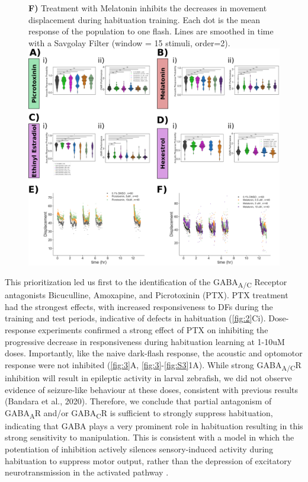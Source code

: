 \documentclass[9pt,lineno]{RandlettLab_elife}
\begin{document}
\begin{figure}
{\textbf{F)} Treatment with Melatonin inhibits the decreases in movement displacement during habituation training. Each dot is the mean response of the population to one flash. Lines are smoothed in time with a Savgolay Filter (window = 15 stimuli, order=2).}{\includegraphics[width=14cm]{FigureS1_DrugBehavData_wDisp}}
\label{fig:S3}
\end{figure}


This prioritization led us first to the identification of the GABA\textsubscript{A/C} Receptor antagonists Bicuculline, Amoxapine, and Picrotoxinin (PTX). PTX treatment had the strongest effects, with increased responsiveness to DFs during the training and test periods, indicative of defects in habituation (\autoref{fig:2}Ci). Dose-response experiments confirmed a strong effect of PTX on inhibiting the progressive decrease in responsiveness during habituation learning at 1-10uM doses. Importantly, like the naive dark-flash response, the acoustic and optomotor response were not inhibited (\autoref{fig:3}A, \autoref{fig:3}-\autoref{fig:S3}1A). While strong GABA\textsubscript{A/C}R inhibition will result in epileptic activity in larval zebrafish, we did not observe evidence of seizure-like behaviour at these doses, consistent with previous results (Bandara et al., 2020). Therefore, we conclude that partial antagonism of GABA\textsubscript{A}R and/or GABA\textsubscript{C}R is sufficient to strongly suppress habituation, indicating that GABA plays a very prominent role in habituation resulting in this strong sensitivity to manipulation. This is consistent with a model in which the potentiation of inhibition actively silences sensory-induced activity during habituation to suppress motor output, rather than the depression of excitatory neurotransmission in the activated pathway \cite{Cooke2020-mz, Ramaswami2014-du}. 
\end{document}
